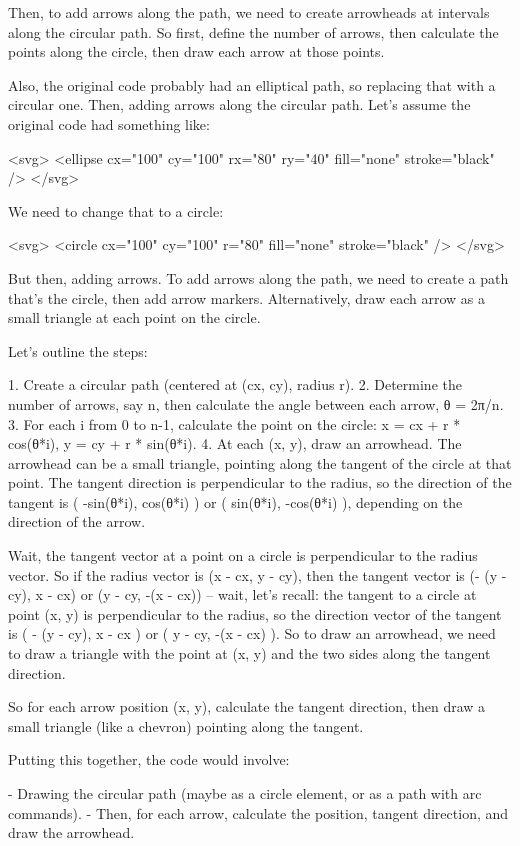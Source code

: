 Then, to add arrows along the path, we need to create arrowheads at intervals along the circular path. So first, define the number of arrows, then calculate the points along the circle, then draw each arrow at those points.

Also, the original code probably had an elliptical path, so replacing that with a circular one. Then, adding arrows along the circular path. Let's assume the original code had something like:

<svg>
  <ellipse cx="100" cy="100" rx="80" ry="40" fill="none" stroke="black" />
</svg>

We need to change that to a circle:

<svg>
  <circle cx="100" cy="100" r="80" fill="none" stroke="black" />
</svg>

But then, adding arrows. To add arrows along the path, we need to create a path that's the circle, then add arrow markers. Alternatively, draw each arrow as a small triangle at each point on the circle.

Let's outline the steps:

1. Create a circular path (centered at (cx, cy), radius r).
2. Determine the number of arrows, say n, then calculate the angle between each arrow, θ = 2π/n.
3. For each i from 0 to n-1, calculate the point on the circle: x = cx + r * cos(θ*i), y = cy + r * sin(θ*i).
4. At each (x, y), draw an arrowhead. The arrowhead can be a small triangle, pointing along the tangent of the circle at that point. The tangent direction is perpendicular to the radius, so the direction of the tangent is ( -sin(θ*i), cos(θ*i) ) or ( sin(θ*i), -cos(θ*i) ), depending on the direction of the arrow.

Wait, the tangent vector at a point on a circle is perpendicular to the radius vector. So if the radius vector is (x - cx, y - cy), then the tangent vector is (- (y - cy), x - cx) or (y - cy, -(x - cx)) – wait, let's recall: the tangent to a circle at point (x, y) is perpendicular to the radius, so the direction vector of the tangent is ( - (y - cy), x - cx ) or ( y - cy, -(x - cx) ). So to draw an arrowhead, we need to draw a triangle with the point at (x, y) and the two sides along the tangent direction.

So for each arrow position (x, y), calculate the tangent direction, then draw a small triangle (like a chevron) pointing along the tangent.

Putting this together, the code would involve:

- Drawing the circular path (maybe as a circle element, or as a path with arc commands).
- Then, for each arrow, calculate the position, tangent direction, and draw the arrowhead.

